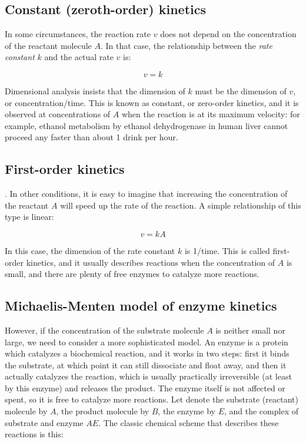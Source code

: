 \documentclass[
  letterpaper,
  DIV=11,
  numbers=noendperiod]{scrreprt}
\begin{document}
\hypertarget{constant-zeroth-order-kinetics}{%
\subsection{Constant (zeroth-order)
kinetics}\label{constant-zeroth-order-kinetics}}

 In some circumstances, the reaction rate
\(v\) does not depend on the concentration of the reactant molecule
\(A\). In that case, the relationship between the
 \emph{rate constant} \(k\) and the actual
rate \(v\) is:

\[
v = k
\]

Dimensional analysis insists that the dimension of \(k\) must be the
dimension of \(v\), or concentration/time. This is known as constant, or
zero-order kinetics, and it is observed at concentrations of \(A\) when
the reaction is at its maximum velocity: for example, ethanol metabolism
by ethanol dehydrogenase in human liver cannot proceed any faster than
about 1 drink per hour.

\hypertarget{first-order-kinetics}{%
\subsection{First-order kinetics}\label{first-order-kinetics}}

. In other conditions, it is easy to imagine
that increasing the concentration of the reactant \(A\) will speed up
the rate of the reaction. A simple relationship of this type is linear:

\[
v = kA
\] \label{eq:kinetics_1st_order}

In this case, the dimension of the rate constant \(k\) is 1/time. This
is called first-order kinetics, and it usually describes reactions when
the concentration of \(A\) is small, and there are plenty of free
enzymes to catalyze more reactions.

\hypertarget{michaelis-menten-model-of-enzyme-kinetics}{%
\subsection{\texorpdfstring{Michaelis-Menten model of enzyme kinetics
}{Michaelis-Menten model of enzyme kinetics }}\label{michaelis-menten-model-of-enzyme-kinetics}}

However, if the concentration of the substrate molecule \(A\) is neither
small nor large, we need to consider a more sophisticated model. An
enzyme is a protein which catalyzes a biochemical reaction, and it works
in two steps: first it binds the substrate, at which point it can still
dissociate and float away, and then it actually catalyzes the reaction,
which is usually practically irreversible (at least by this enzyme) and
releases the product. The enzyme itself is not affected or spent, so it
is free to catalyze more reactions. Let denote the substrate (reactant)
molecule by \(A\), the product molecule by \(B\), the enzyme by \(E\),
and the complex of substrate and enzyme \(AE\). The classic chemical
scheme that describes these reactions is this:
\end{document}
